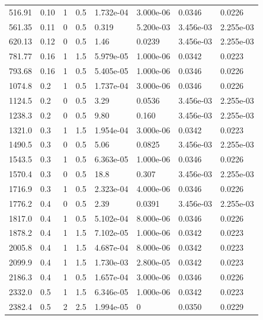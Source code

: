 \documentclass[preview]{standalone}
\begin{document}
{{\begin{tabular}{L{1.2cm}C{1.2cm} C{0.3cm}C{0.5cm} C{1.4cm}C{1.4cm} C{1.4cm}C{1.4cm}}
  516.91  &  0.10  & 1     & 0.5 &  1.732e-04  & 3.000e-06  & 0.0346 &  0.0226   \\ 
  561.35  &  0.11  & 0     & 0.5 &  0.319  & 5.200e-03  & 3.456e-03 &  2.255e-03   \\ 
  620.13  &  0.12  & 0     & 0.5 &  1.46  & 0.0239  & 3.456e-03 &  2.255e-03   \\ 
  781.77  &  0.16  & 1     & 1.5 &  5.979e-05  & 1.000e-06  & 0.0342 &  0.0223   \\ 
  793.68  &  0.16  & 1     & 0.5 &  5.405e-05  & 1.000e-06  & 0.0346 &  0.0226   \\ 
  1074.8  &   0.2  & 1     & 0.5 &  1.737e-04  & 3.000e-06  & 0.0346 &  0.0226   \\ 
  1124.5  &   0.2  & 0     & 0.5 &  3.29  & 0.0536  & 3.456e-03 &  2.255e-03   \\ 
  1238.3  &   0.2  & 0     & 0.5 &  9.80  & 0.160  & 3.456e-03 &  2.255e-03   \\ 
  1321.0  &   0.3  & 1     & 1.5 &  1.954e-04  & 3.000e-06  & 0.0342 &  0.0223   \\ 
  1490.5  &   0.3  & 0     & 0.5 &  5.06  & 0.0825  & 3.456e-03 &  2.255e-03   \\ 
  1543.5  &   0.3  & 1     & 0.5 &  6.363e-05  & 1.000e-06  & 0.0346 &  0.0226   \\ 
  1570.4  &   0.3  & 0     & 0.5 &  18.8  & 0.307  & 3.456e-03 &  2.255e-03   \\ 
  1716.9  &   0.3  & 1     & 0.5 &  2.323e-04  & 4.000e-06  & 0.0346 &  0.0226   \\ 
  1776.2  &   0.4  & 0     & 0.5 &  2.39  & 0.0391  & 3.456e-03 &  2.255e-03   \\ 
  1817.0  &   0.4  & 1     & 0.5 &  5.102e-04  & 8.000e-06  & 0.0346 &  0.0226   \\ 
  1878.2  &   0.4  & 1     & 1.5 &  7.102e-05  & 1.000e-06  & 0.0342 &  0.0223   \\ 
  2005.8  &   0.4  & 1     & 1.5 &  4.687e-04  & 8.000e-06  & 0.0342 &  0.0223   \\ 
  2099.9  &   0.4  & 1     & 1.5 &  1.730e-03  & 2.800e-05  & 0.0342 &  0.0223   \\ 
  2186.3  &   0.4  & 1     & 0.5 &  1.657e-04  & 3.000e-06  & 0.0346 &  0.0226   \\ 
  2332.0  &   0.5  & 1     & 1.5 &  6.346e-05  & 1.000e-06  & 0.0342 &  0.0223   \\ 
  2382.4  &   0.5  & 2     & 2.5 &  1.994e-05  & 0  & 0.0350 &  0.0229   \\ 

\end{tabular}}}
\end{document}
